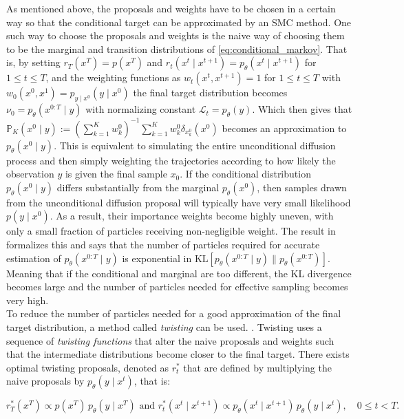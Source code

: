 As mentioned above, the proposals and weights have to be chosen in a certain way so that the conditional target can be approximated by an SMC method. One such way to choose the proposals and weights is the naive way of choosing them to be the marginal and transition distributions of \eqref{eq:conditional_markov}. That is, by setting $r_T(x^T) = p(x^T)$ and $r_t(x^t \mid x^{t+1}) = p_\theta(x^t \mid x^{t+1})$ for $1 \leq t \leq T$, and the weighting functions as $w_t(x^t, x^{t+1}) = 1$ for $1 \leq t \leq T$ with $w_0(x^0, x^1) = p_{y \mid x^0}(y \mid x^0)$ the final target distribution becomes $\nu_0 = p_\theta(x^{0:T} \mid y)$ with normalizing constant $\mathcal{L}_t = p_\theta(y)$. Which then gives that $\mathbb{P}_K(x^0 \mid y) := (\sum_{k=1}^K w_k^0)^{-1} \sum_{k=1}^K w_k^0 \delta_{x_k^0}(x^0)$ becomes an approximation to $p_\theta(x^0 \mid y)$. This is equivalent to simulating the entire unconditional diffusion process and then simply weighting the trajectories according to how likely the observation $y$ is given the final sample $x_0$. If the conditional distribution $p_\theta(x^0 \mid y)$ differs substantially from the marginal $p_\theta(x^0)$, then  samples drawn from the unconditional diffusion proposal will typically have very small likelihood $p(y \mid x^0)$. As a result, their importance weights become highly uneven, with only a small fraction of particles receiving non-negligible weight. The result in \cite{chatterjee2017samplesizerequiredimportance} formalizes this and says that the number of particles required for accurate estimation of $p_\theta(x^{0:T} \mid y)$ is exponential in $\text{KL}[p_\theta(x^{0:T} \mid y) \parallel p_\theta(x^{0:T})]$. Meaning that if the conditional and marginal are too different, the KL divergence becomes large and the number of particles needed for effective sampling becomes very high.\\ 

To reduce the number of particles needed for a good approximation of the final target distribution, a method called \textit{twisting} can be used. \cite{guarniero2016iteratedauxiliaryparticlefilter} \cite{Heng_2020} \cite{naesseth2024elementssequentialmontecarlo}. Twisting uses a sequence of \textit{twisting functions} that alter the naive proposals and weights such that the intermediate distributions become closer to the final target. There exists optimal twisting proposals, denoted as $r^*_t$ that are defined by multiplying the naive proposals by $p_\theta(y \mid x^t)$, that is:

\begin{equation}
r_T^*(x^T) \propto p(x^T)\, p_\theta(y \mid x^T)
\text{ and }
r_t^*(x^t \mid x^{t+1}) \propto p_\theta(x^t \mid x^{t+1})\, p_\theta(y \mid x^t), \quad 0 \leq t < T.
\end{equation}

